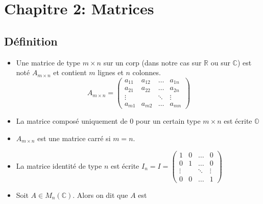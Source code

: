 \section*{Chapitre 2: Matrices}

\subsection*{Définition}
\begin{itemize}
    \item[] Une matrice de type $m \times n$ sur un corp (dans notre cas sur $\mathbb{R}$ ou sur $\mathbb{C}$) est noté
          $A_{m \times n}$ et contient $m$ lignes et $n$ colonnes. \begin{equation*}
              A_{m \times n} = \begin{pmatrix}
                  a_{11} & a_{12}      & \dots  & a_{1n} \\
                  a_{21} & a_{22}      & \dots  & a_{2n} \\
                  \vdots & \phantom{a} & \ddots & \vdots \\
                  a_{m1} & a_{m2}      & \dots  & a_{mn}
              \end{pmatrix}
          \end{equation*}
    \item[] La matrice composé uniquement de 0 pour un certain type $m \times n$ est écrite $\mathbb{O}$
    \item[] $A_{m \times n}$ est une matrice carré si $m = n$.
    \item[] La matrice identité de type $n$ est écrite $I_n = I = \begin{pmatrix}
                  1      & 0           & \dots  & 0      \\
                  0      & 1           & \dots  & 0      \\
                  \vdots & \phantom{a} & \ddots & \vdots \\
                  0      & 0           & \dots  & 1
              \end{pmatrix}$
    \item[] Soit $A \in M_n(\mathbb{C})$. Alors on dit que $A$ est 
\end{itemize}
